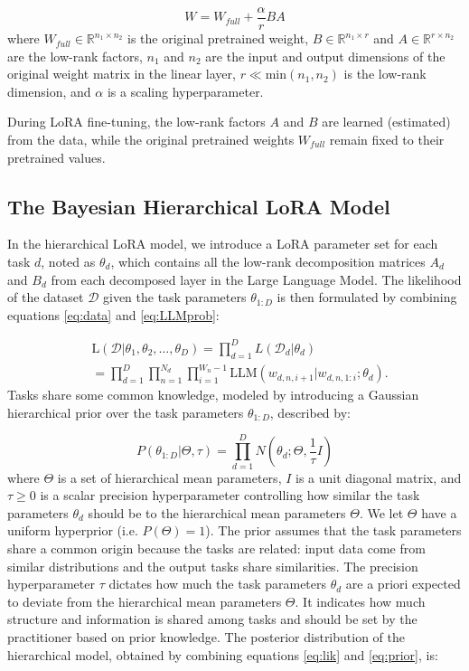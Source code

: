 \documentclass[fullpaper]{nldl}
\newcommand{\R}{\mathbb{R}}
\begin{document}
\begin{equation} \label{eq:LoRA}
    W = W_{full} + \frac{\alpha}{r} BA
\end{equation}
%
where
$W_{full} \in \R^{n_1 \times n_2}$ is the original pretrained weight,
$B \in \R^{n_1 \times r}$ and $A \in \R^{r \times n_2}$ are the low-rank factors,
$n_1$ and $n_2$ are the input and output dimensions of the original weight matrix in the linear layer,
$r \ll \text{min}(n_1, n_2)$ is the low-rank dimension,
and $\alpha$ is a scaling hyperparameter.

During LoRA fine-tuning, the low-rank factors $A$ and $B$ are learned (estimated) from the data, while the original pretrained weights $W_{full}$ remain fixed to their pretrained values.

\subsection{The Bayesian Hierarchical LoRA Model} \label{sec:BoRA}
In the hierarchical LoRA model, we introduce a LoRA parameter set for each task $d$, noted as $\theta_d$, which contains all the low-rank decomposition matrices $A_d$ and $B_d$ from each decomposed layer in the Large Language Model. The likelihood of the dataset $\mathcal{D}$ given the task parameters $\theta_{1:D}$ is then formulated by combining equations \ref{eq:data} and \ref{eq:LLMprob}:

\begin{align}  \label{eq:lik}
    & \text{L}(\mathcal{D} | \theta_1, \theta_2, \ldots, \theta_D) = \prod_{d=1}^D L(\mathcal{D}_d | \theta_d) \nonumber \\
    &= \prod_{d=1}^D \prod_{n=1}^{N_d} \prod_{i=1}^{W_n-1} \text{LLM}(w_{d,n,i+1} | w_{d,n,1:i}; \theta_d).
\end{align}
%
Tasks share some common knowledge, modeled by introducing a Gaussian hierarchical prior over the task parameters $\theta_{1:D}$, described by:

\begin{equation} \label{eq:prior}
    P(\theta_{1:D} | \Theta, \tau) = \prod_{d=1}^D N(\theta_d ; \Theta, \frac{1}{\tau} I)
\end{equation}
where $\Theta$ is a set of hierarchical mean parameters, $I$ is a unit diagonal matrix, and $\tau \geq 0$ is a scalar precision hyperparameter controlling how similar the task parameters $\theta_d$ should be to the hierarchical mean parameters $\Theta$.
We let $\Theta$ have a uniform hyperprior (i.e. $P(\Theta) = 1$). The prior assumes that the task parameters share a common origin because the tasks are related: input data come from similar distributions and the output tasks share similarities. The precision hyperparameter $\tau$ dictates how much the task parameters $\theta_d$ are a priori expected to deviate from the hierarchical mean parameters $\Theta$. It indicates how much structure and information is shared among tasks and should be set by the practitioner based on prior knowledge.
The posterior distribution of the hierarchical model, obtained by combining equations \ref{eq:lik} and \ref{eq:prior}, is:
\end{document}
